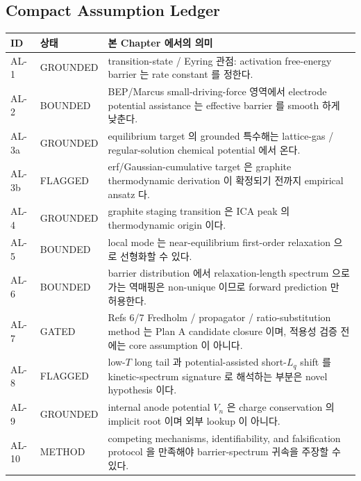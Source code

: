 \documentclass[11pt,a4paper]{article}
\begin{document}
\subsection{Compact Assumption Ledger}\label{sec:assumption_ledger}
\begin{longtable}{p{} p{} p{}}
\toprule ID & 상태 & 본 Chapter 에서의 의미 \\ \midrule \endhead
AL-1 & GROUNDED & transition-state / Eyring 관점: activation free-energy barrier 는 rate constant 를 정한다. \\
AL-2 & BOUNDED & BEP/Marcus small-driving-force 영역에서 electrode potential assistance 는 effective barrier 를 smooth 하게 낮춘다. \\
AL-3a & GROUNDED & equilibrium target 의 grounded 특수해는 lattice-gas / regular-solution chemical potential 에서 온다. \\
AL-3b & FLAGGED & erf/Gaussian-cumulative target 은 graphite thermodynamic derivation 이 확정되기 전까지 empirical ansatz 다. \\
AL-4 & GROUNDED & graphite staging transition 은 ICA peak 의 thermodynamic origin 이다. \\
AL-5 & BOUNDED & local mode 는 near-equilibrium first-order relaxation 으로 선형화할 수 있다. \\
AL-6 & BOUNDED & barrier distribution 에서 relaxation-length spectrum 으로 가는 역매핑은 non-unique 이므로 forward prediction 만 허용한다. \\
AL-7 & GATED & Refs 6/7 Fredholm / propagator / ratio-substitution method 는 Plan A candidate closure 이며, 적용성 검증 전에는 core assumption 이 아니다. \\
AL-8 & FLAGGED & low-$T$ long tail 과 potential-assisted short-$L_q$ shift 를 kinetic-spectrum signature 로 해석하는 부분은 novel hypothesis 이다. \\
AL-9 & GROUNDED & internal anode potential $V_n$ 은 charge conservation 의 implicit root 이며 외부 lookup 이 아니다. \\
AL-10 & METHOD & competing mechanisms, identifiability, and falsification protocol 을 만족해야 barrier-spectrum 귀속을 주장할 수 있다. \\
\bottomrule
\end{longtable}

\end{document}
